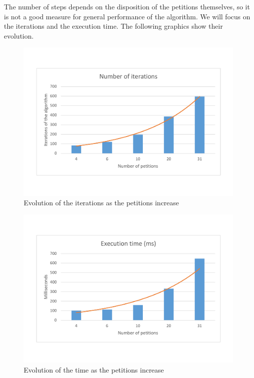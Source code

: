 \documentclass[12pt,a4paper,oneside]{article}
\numberwithin{equation}{section}
\numberwithin{equation}{section}
\theoremstyle{definition}
\begin{document}
The number of steps depends on the disposition of the petitions themselves, so it is not a good measure for general performance of the algorithm. We will focus on the iterations and the execution time. The following graphics show their evolution.

\begin{figure}[H]
	\centering
	\includegraphics[scale=0.4]{figures/iterations.pdf}
	\caption{Evolution of the iterations as the petitions increase}
	\label{iterations} 
\end{figure}


\begin{figure}[H]
	\centering
	\includegraphics[scale=0.4]{figures/time.pdf}
	\caption{Evolution of the time as the petitions increase}
	\label{time} 
\end{figure}
\end{document}
